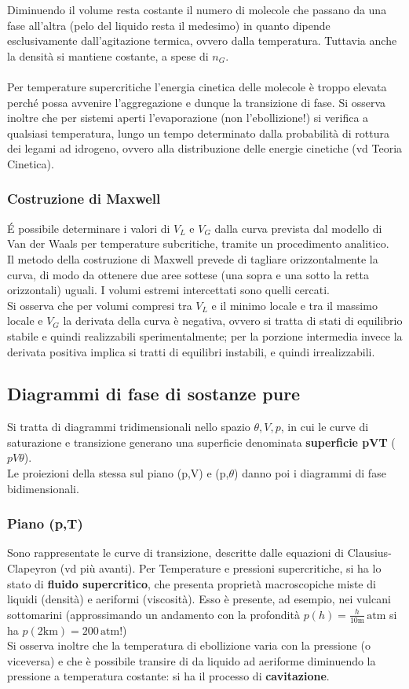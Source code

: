 \documentclass[10pt, oneside]{book}
\begin{document}
Diminuendo il volume resta costante il numero di molecole che passano da una fase all'altra (pelo del liquido resta il medesimo) in quanto dipende esclusivamente dall'agitazione termica, ovvero dalla temperatura. Tuttavia anche la densità si mantiene costante, a spese di $n_G$.
\\~\\Per temperature supercritiche l'energia cinetica delle molecole è troppo elevata perché possa avvenire l'aggregazione e dunque la transizione di fase. Si osserva inoltre che per sistemi aperti l'evaporazione (non l'ebollizione!) si verifica a qualsiasi temperatura, lungo un tempo determinato dalla probabilità di rottura dei legami ad idrogeno, ovvero alla distribuzione delle energie cinetiche (vd Teoria Cinetica).
\subsubsection*{Costruzione di Maxwell}
\'E possibile determinare i valori di $V_L$ e $V_G$ dalla curva prevista dal modello di Van der Waals per temperature subcritiche, tramite un procedimento analitico. 
\\Il metodo della costruzione di Maxwell prevede di tagliare orizzontalmente la curva, di modo da ottenere due aree sottese (una sopra e una sotto la retta orizzontali) uguali. I volumi estremi intercettati sono quelli cercati.
\\Si osserva che per volumi compresi tra $V_L$ e il minimo locale e tra il massimo locale e $V_G$ la derivata della curva è negativa, ovvero si tratta di stati di equilibrio stabile e quindi realizzabili sperimentalmente; per la porzione intermedia invece la derivata positiva implica si tratti di equilibri instabili, e quindi irrealizzabili.

\subsection{Diagrammi di fase di sostanze pure}
Si tratta di diagrammi tridimensionali nello spazio $\theta, V, p$, in cui le curve di saturazione e transizione generano una superficie denominata \textbf{superficie pVT} ($pV\theta$).
\\Le proiezioni della stessa sul piano (p,V) e (p,$\theta$) danno poi i diagrammi di fase bidimensionali.
\subsubsection{Piano (p,T)}
Sono rappresentate le curve di transizione, descritte dalle equazioni di Clausius-Clapeyron (vd più avanti). Per Temperature e pressioni supercritiche, si ha lo stato di \textbf{fluido supercritico}, che presenta proprietà macroscopiche miste di liquidi (densità) e aeriformi (viscosità). Esso è presente, ad esempio, nei vulcani sottomarini (approssimando un andamento con la profondità $\displaystyle p(h) = \frac{h}{10 \mathrm{m}} \, \mathrm{atm}$ si ha $p(2 \mathrm{km}) = 200 \, \mathrm{atm}$!)
\\Si osserva inoltre che la temperatura di ebollizione varia con la pressione (o viceversa) e che è possibile transire di da liquido ad aeriforme diminuendo la pressione a temperatura costante: si ha il processo di \textbf{cavitazione}.
\end{document}
